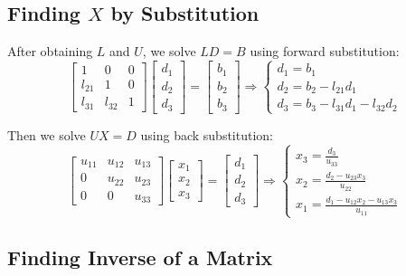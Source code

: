 \documentclass[a4paper,12pt]{article}
\begin{document}
\subsection{Finding {$X$} by Substitution}

After obtaining \( L \) and \( U \), we solve \( LD = B \) using forward substitution:
\[
\begin{bmatrix}
	1 & 0 & 0 \\
	l_{21} & 1 & 0 \\
	l_{31} & l_{32} & 1
\end{bmatrix}
\begin{bmatrix}
	d_1 \\ d_2 \\ d_3
\end{bmatrix}
=
\begin{bmatrix}
	b_1 \\ b_2 \\ b_3
\end{bmatrix}
\Rightarrow
\left\{
\begin{array}{l}
	d_1 = b_1 \\
	d_2 = b_2 - l_{21} d_1 \\
	d_3 = b_3 - l_{31} d_1 - l_{32} d_2
\end{array}
\right.
\]

Then we solve \( UX = D \) using back substitution:
\[
\begin{bmatrix}
	u_{11} & u_{12} & u_{13} \\
	0 & u_{22} & u_{23} \\
	0 & 0 & u_{33}
\end{bmatrix}
\begin{bmatrix}
	x_1 \\ x_2 \\ x_3
\end{bmatrix}
=
\begin{bmatrix}
	d_1 \\ d_2 \\ d_3
\end{bmatrix}
\Rightarrow
\left\{
\begin{array}{l}
	x_3 = \frac{d_3}{u_{33}} \\
	x_2 = \frac{d_2 - u_{23} x_3}{u_{22}} \\
	x_1 = \frac{d_1 - u_{12} x_2 - u_{13} x_3}{u_{11}}
\end{array}
\right.
\]

\subsection{Finding Inverse of a Matrix}
\end{document}
